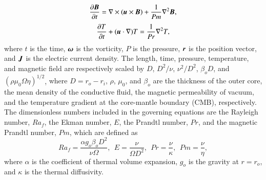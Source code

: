 %
\begin{equation}
\frac{\partial \mbox{\boldmath$B$}}{\partial t} =
 \nabla \times (\mbox{\boldmath$u$} \times \mbox{\boldmath$B$} )
 + \frac{1}{Pm} \nabla^2 \mbox{\boldmath$B$} ,
\label{eq:induction}
\end{equation}
%
\begin{equation}
\frac{\partial T}{\partial t} 
 + ( \mbox{\boldmath$u$} \cdot \nabla ) T =
 \frac{1}{Pr} \nabla^2 T ,
\label{eq:heat}
\end{equation}
%
where $t$ is the time, $\mbox{\boldmath$\omega$}$ is the vorticity, $P$ is the pressure, $\mbox{\boldmath$r$}$ is the position vector, and $\mbox{\boldmath$J$}$ is the electric current density.
The length, time, pressure, temperature, and magnetic field are respectively scaled by $D$, $D^2/\nu$, $\nu^2 /D^2$, $\beta_o D$, and $(\rho \mu_0 \Omega \eta )^{1/2}$, %
{\color{blue}
where $D = r_o - r_i$, $\rho$, $\mu_0$, and $\beta_o$ are the thickness of the outer core, the mean density of the conductive fluid, the magnetic permeability of vacuum, and the temperature gradient at the core-mantle boundary (CMB), respectively.
}
The dimensionless numbers included in the governing equations are the Rayleigh number, $Ra_f$, the Ekman number, $E$, the Prandtl number, $Pr$, and the magnetic Prandtl number, $Pm$, which are defined as
%
\begin{equation}
Ra_f = \frac{\alpha g_o \beta_o D^2}{\nu \Omega},~~
E = \frac{\nu}{\Omega D^2},~~
Pr = \frac{\nu}{\kappa},~~
Pm = \frac{\nu}{\eta},
\label{eq:dimensionless_numbers}
\end{equation}
%
where $\alpha$ is the coefficient of thermal volume expansion, $g_o$ is the gravity at $r = r_o$, and $\kappa$ is the thermal diffusivity.

